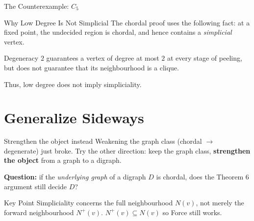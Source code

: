 \documentclass[11pt]{beamer}
\begin{document}
\begin{frame}{The Counterexample: $C_5$}
  \begin{center}
  \end{center}
\end{frame}

\begin{frame}{Why Low Degree Is Not Simplicial}
  The chordal proof uses the following fact: at a fixed point, the
  undecided region is chordal, and hence contains a \emph{simplicial}
  vertex.

  \smallskip

  Degeneracy $2$ guarantees a vertex of degree at most $2$ at every
  stage of peeling, but does not guarantee that its neighbourhood is
  a clique.

  \smallskip

  Thus, low degree does not imply simpliciality.
\end{frame}

\section{Generalize Sideways}

\begin{frame}{Strengthen the object instead}
  Weakening the graph class (chordal $\to$ degenerate) just broke. Try the
  other direction: keep the graph class, \textbf{strengthen the object} from a
  graph to a digraph.

  \smallskip
  \textbf{Question:} if the \emph{underlying graph} of a digraph $D$ is
  chordal, does the Theorem 6 argument still decide $D$?

  \smallskip
  \begin{block}{Key Point}
    Simpliciality concerns the full neighbourhood $N(v)$, not merely
    the forward neighbourhood $N^+(v)$. $N^+(v)\subseteq N(v)$ so Force still works.
  \end{block}
\end{frame}
\end{document}
